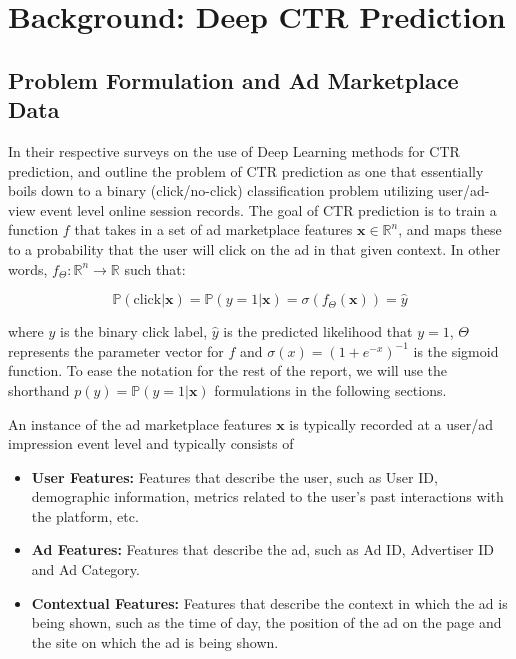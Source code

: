 \documentclass{mldsmsc}
\begin{document}
\chapter{Background: Deep CTR Prediction}
\label{chap:background-deepctr}

\section{Problem Formulation and Ad Marketplace Data}
\label{sec:problem-formulation-data}

In their respective surveys on the use of Deep Learning methods for CTR prediction, \cite{RefWorks:gu2021ad} 
and \cite{RefWorks:zhang2021deep} outline the problem of CTR prediction as one that essentially boils down to
a binary (click/no-click) classification problem utilizing user/ad-view event level online session records. 
The goal of CTR prediction is to train a function $f$ that takes in a set of ad marketplace 
features $\mathbf{x} \in \mathbb{R}^n$, and maps these to a probability that the user 
will click on the ad in that given context. In other words, $f_{\Theta}: \mathbb{R}^n \rightarrow \mathbb{R}$ such that:

\begin{equation}
\label{eqn:ctr-classifier}
\mathbb{P}(\text{click}| \mathbf{x})
= \mathbb{P}(y = 1 | \mathbf{x})
= \sigma(f_{\Theta}(\mathbf{x}))
= \hat{y}
\end{equation}

where $y$ is the binary click label, $\hat{y}$ is the predicted likelihood that $y=1$, $\Theta$ represents the parameter vector for $f$ and
$\sigma(x)=(1 + e^{-x})^{-1}$ is the sigmoid function. To ease the notation for the rest of the report,
we will use the shorthand $p(y) = \mathbb{P}(y=1 | \mathbf{x})$ formulations in the following
sections. 

An instance of the ad marketplace features $\mathbf{x}$ is typically
recorded at a user/ad impression event level and typically consists of

\begin{itemize}
\item \textbf{User Features:} Features that describe the user, such as User ID, demographic information,
metrics related to the user's past interactions with the platform, etc.
\item \textbf{Ad Features:} Features that describe the ad, such as Ad ID, Advertiser ID and Ad Category.
\item \textbf{Contextual Features:} Features that describe the context in which the ad is being shown, such as
the time of day, the position of the ad on the page and the site on which the ad is being shown.
\end{itemize}
\end{document}
